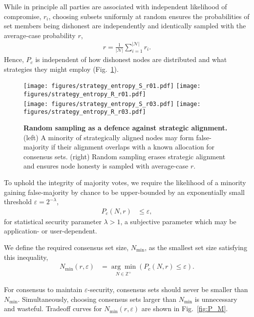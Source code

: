 \documentclass[twocolumn, aps, amsmath, amssymb, nofootinbib, superscriptaddress, longbibliography, floatfix, eqsecnum, rmp]{revtex4-2}
\begin{document}
While in principle all parties are associated with independent likelihood of compromise, $r_i$, choosing subsets uniformly at random ensures the probabilities of set members being dishonest are independently and identically sampled with the average-case probability $r$,
\begin{align} \label{eq:av_r_uniform}
	r = \frac{1}{|\mathcal{N}|} \sum_{i=1}^{|\mathcal{N}|} r_i.
\end{align}
Hence, $P_c$ is independent of how dishonest nodes are distributed and what strategies they might employ (Fig.~\ref{fig:strategy_entropy}).

\begin{figure}[!htb]
	\texttt{[image: figures/strategy\_entropy\_S\_r01.pdf]}
	\texttt{[image: figures/strategy\_entropy\_R\_r01.pdf]}\\
	\texttt{[image: figures/strategy\_entropy\_S\_r03.pdf]}
	\texttt{[image: figures/strategy\_entropy\_R\_r03.pdf]}
	\caption{\textbf{Random sampling as a defence against strategic alignment.} (left) A minority of strategically aligned nodes may form false-majority if their alignment overlaps with a known allocation for consensus sets. (right) Random sampling erases strategic alignment and ensures node honesty is sampled with average-case $r$.} \label{fig:strategy_entropy}
\end{figure}

To uphold the integrity of majority votes, we require the likelihood of a minority gaining false-majority by chance to be upper-bounded by an exponentially small threshold $\varepsilon = 2^{-\lambda}$,
\begin{align}
	P_c(N,r) &\leq\varepsilon,
\end{align}
for statistical security parameter $\lambda>1$, a subjective parameter which may be application- or user-dependent. %

We define the required consensus set size, $N_\mathrm{min}$, as the smallest set size satisfying this inequality,
\begin{align}
	N_\mathrm{min}(r,\varepsilon) &= \underset{N\in\mathbb{Z}^+}{\arg\min}(P_c(N,r)\leq\varepsilon).	
\end{align}

For consensus to maintain $\varepsilon$-security, consensus sets should never be smaller than $N_\mathrm{min}$. Simultaneously, choosing consensus sets larger than $N_\mathrm{min}$ is unnecessary and wasteful. Tradeoff curves for $N_\mathrm{min}(r,\varepsilon)$ are shown in Fig.~\ref{fig:P_M}.
\end{document}
